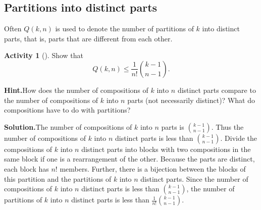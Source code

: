 \documentclass[10pt,]{book}
\theoremstyle{plain}
\theoremstyle{definition}
\newtheorem{activity}[project]{Activity}
\numberwithin{equation}{chapter}
\begin{document}
\subsection[{Partitions into distinct parts}]{Partitions into distinct parts}\label{subsection-39}
Often \(Q(k,n)\) is used to denote the number of partitions of \(k\) into distinct parts, that is, parts that are different from each other.%
\begin{activity}[]\label{activity-160}
Show that%
\begin{equation*}
Q(k,n) \le \frac{1}{n!}\binom{k-1}{n-1}.
\end{equation*}
%
\par\medskip\noindent%
\textbf{Hint.}\quad How does the number of compositions of \(k\) into \(n\) distinct parts compare to the number of compositions of \(k\) into \(n\) parts (not necessarily distinct)? What do compositions have to do with partitions?%
\par\medskip\noindent%
\textbf{Solution.}\quad The number of compositions of \(k\) into \(n\) parts is \(\binom{k-1}{n-1}\). Thus the number of compositions of \(k\) into \(n\) distinct parts is less than \(\binom{k-1}{n-1}\). Divide the compositions of \(k\) into \(n\) distinct parts into blocks with two compositions in the same block if one is a rearrangement of the other. Because the parts are distinct, each block has \(n!\) members. Further, there is a bijection between the blocks of this partition and the partitions of \(k\) into \(n\) distinct parts. Since the number of compositions of \(k\) into \(n\) distinct parts is less than \(\binom{k-1}{n-1}\), the number of partitions of \(k\) into \(n\) distinct parts is less than \(\frac{1}{n!}  \binom{k-1}{n-1}\).%
\end{activity}
\end{document}
